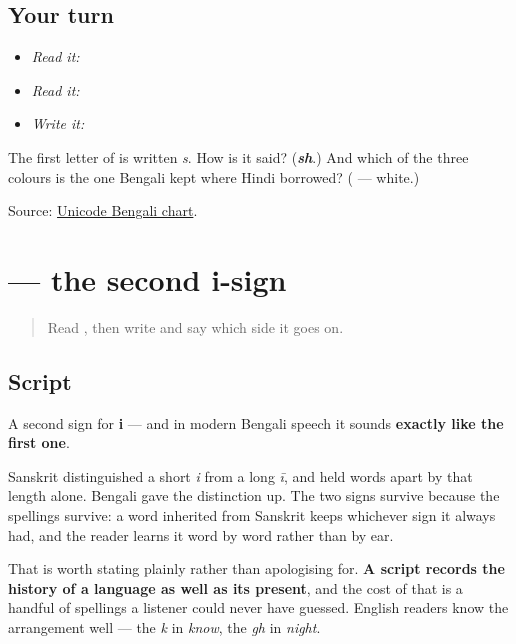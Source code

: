 \subsection*{Your turn}
\begin{itemize}
\raggedright
  \item \emph{Read it:} 
  \item \emph{Read it:}   
  \item \emph{Write it:} 
\end{itemize}

\begin{tcolorbox}[breakable,colback=teal!4,colframe=teal!35!black,title={Before you move on}]
The first letter of \textbf{} is written \emph{s}. How is it said? (\emph{\textbf{sh}}.) And which of the three colours is the one Bengali kept where Hindi borrowed? (\textbf{} — white.)

Source: \href{https://www.unicode.org/charts/PDF/U0980.pdf}{Unicode Bengali chart}.
\end{tcolorbox}
\section[-i (long)]{ — the second i-sign}

\label{lesson:BN-W04-ii-matra}



\begin{quote}
Read \textbf{}, then write \textbf{} and say which side it goes on.
\end{quote}

\subsection*{Script}
\begin{quote}
\end{quote}

A second sign for \textbf{i} — and in modern Bengali speech it sounds \textbf{exactly like the first one}.

Sanskrit distinguished a short \emph{i} from a long \emph{ī}, and held words apart by that length alone. Bengali gave the distinction up. The two signs survive because the spellings survive: a word inherited from Sanskrit keeps whichever sign it always had, and the reader learns it word by word rather than by ear.

That is worth stating plainly rather than apologising for. \textbf{A script records the history of a language as well as its present}, and the cost of that is a handful of spellings a listener could never have guessed. English readers know the arrangement well — the \emph{k} in \emph{know}, the \emph{gh} in \emph{night}.

